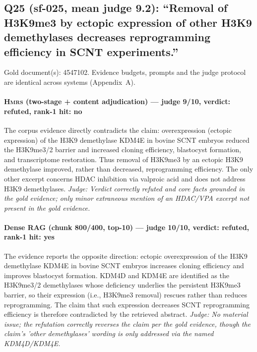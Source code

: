 \documentclass[sigconf, review, anonymous]{acmart}
\begin{document}
\subsection{Q25 (sf-025, mean judge 9.2): ``Removal of H3K9me3 by ectopic expression of other H3K9 demethylases decreases reprogramming efficiency in SCNT experiments.''}
\label{app:q25}
\noindent Gold document(s): 4547102. Evidence budgets, prompts and the judge protocol are identical across systems (Appendix~A).
\paragraph{\textbf{\textsc{Hmrs}} (two-stage + content adjudication) --- judge 9/10, verdict: refuted, rank-1 hit: no}
\noindent The corpus evidence directly contradicts the claim: overexpression (ectopic expression) of the H3K9 demethylase KDM4E in bovine SCNT embryos reduced the H3K9me3/2 barrier and increased cloning efficiency, blastocyst formation, and transcriptome restoration. Thus removal of H3K9me3 by an ectopic H3K9 demethylase improved, rather than decreased, reprogramming efficiency. The only other excerpt concerns HDAC inhibition via valproic acid and does not address H3K9 demethylases.
\noindent\small\textit{Judge: Verdict correctly refuted and core facts grounded in the gold evidence; only minor extraneous mention of an HDAC/VPA excerpt not present in the gold evidence.}
\paragraph{Dense RAG (chunk 800/400, top-10) --- judge 10/10, verdict: refuted, rank-1 hit: yes}
\noindent The evidence reports the opposite direction: ectopic overexpression of the H3K9 demethylase KDM4E in bovine SCNT embryos increases cloning efficiency and improves blastocyst formation. KDM4D and KDM4E are identified as the H3K9me3/2 demethylases whose deficiency underlies the persistent H3K9me3 barrier, so their expression (i.e., H3K9me3 removal) rescues rather than reduces reprogramming. The claim that such expression decreases SCNT reprogramming efficiency is therefore contradicted by the retrieved abstract.
\noindent\small\textit{Judge: No material issue; the refutation correctly reverses the claim per the gold evidence, though the claim's 'other demethylases' wording is only addressed via the named KDM4D/KDM4E.}
\end{document}
